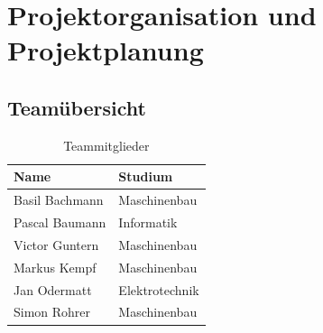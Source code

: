 \documentclass[a4paper]{report}
\begin{document}
\chapter{Projektorganisation und Projektplanung}
\label{ch:ProjektOrga}

\section{Teamübersicht}
\label{sec:Teamuebersicht}
\begin{table}[h!]
	\centering
	\begin{tabular}{|p{}|p{}|}
		\hline
		\textbf{Name} & \textbf{Studium} \\
		\hline
		Basil Bachmann & Maschinenbau \\
		\hline
		Pascal Baumann & Informatik \\
		\hline
		Victor Guntern & Maschinenbau \\
		\hline
		Markus Kempf & Maschinenbau \\
		\hline
		Jan Odermatt & Elektrotechnik \\
		\hline
		Simon Rohrer & Maschinenbau \\
		\hline
	\end{tabular}
	\caption{Teammitglieder}
	\label{tab:TeamMitglieder}
\end{table}

\newpage
\end{document}
